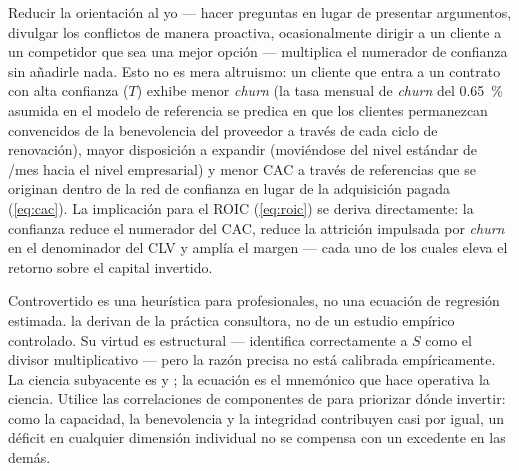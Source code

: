 Reducir la orientación al yo --- hacer preguntas en lugar de presentar argumentos, divulgar los
conflictos de manera proactiva, ocasionalmente dirigir a un cliente a un competidor que sea una
mejor opción --- multiplica el numerador de confianza sin añadirle nada. Esto no es mera
altruismo: un cliente que entra a un contrato con alta confianza (\(T\)) exhibe menor
\emph{churn} (la tasa mensual de \emph{churn} del \qty{0.65}{\percent} asumida en el modelo
de referencia se predica en que los clientes permanezcan convencidos de la benevolencia del
proveedor a través de cada ciclo de renovación), mayor disposición a expandir (moviéndose del
nivel estándar de /mes hacia el nivel empresarial) y menor CAC a través de referencias
que se originan dentro de la red de confianza en lugar de la adquisición pagada (\cref{eq:cac}).
La implicación para el ROIC (\cref{eq:roic}) se deriva directamente: la confianza reduce el
numerador del CAC, reduce la attrición impulsada por \emph{churn} en el denominador del CLV y
amplía el margen --- cada uno de los cuales eleva el retorno sobre el capital invertido.

\begin{admonition}{Controvertido}
 es una heurística para profesionales, no una ecuación de regresión estimada.
\textcite{maister2000trusted} la derivan de la práctica consultora, no de un estudio empírico
controlado. Su virtud es estructural --- identifica correctamente a \(S\) como el divisor
multiplicativo --- pero la razón precisa no está calibrada empíricamente. La ciencia subyacente
es \textcite{mayer1995model} y \textcite{colquitt2007meta}; la ecuación es el mnemónico que
hace operativa la ciencia. Utilice las correlaciones de componentes de \textcite{colquitt2007meta}
para priorizar dónde invertir: como la capacidad, la benevolencia y la integridad contribuyen
casi por igual, un déficit en cualquier dimensión individual no se compensa con un excedente en
las demás.
\end{admonition}

